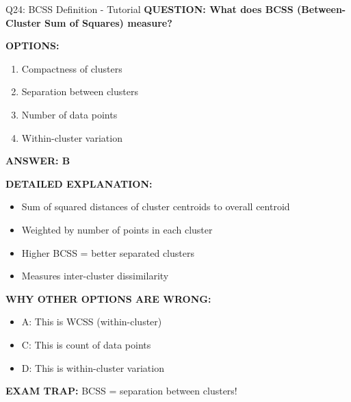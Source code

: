 \documentclass[8pt]{beamer}
\begin{document}
	\begin{frame}{Q24: BCSS Definition - Tutorial}
		\fontsize{6.5}{7.5}\selectfont
		\textbf{QUESTION: What does BCSS (Between-Cluster Sum of Squares) measure?}
		
		\vspace{0.1cm}
		\textbf{OPTIONS:}
		\begin{enumerate}
			\item Compactness of clusters
			\item Separation between clusters
			\item Number of data points
			\item Within-cluster variation
		\end{enumerate}
		
		\vspace{0.1cm}
		\textcolor{myblue}{\textbf{ANSWER: B}}
		
		\vspace{0.1cm}
		\textbf{DETAILED EXPLANATION:}
		\begin{itemize}
			\item Sum of squared distances of cluster centroids to overall centroid
			\item Weighted by number of points in each cluster
			\item Higher BCSS = better separated clusters
			\item Measures inter-cluster dissimilarity
		\end{itemize}
		
		\vspace{0.1cm}
		\textcolor{myred}{\textbf{WHY OTHER OPTIONS ARE WRONG:}}
		\begin{itemize}
			\item \textcolor{myred}{A:} This is WCSS (within-cluster)
			\item \textcolor{myred}{C:} This is count of data points
			\item \textcolor{myred}{D:} This is within-cluster variation
		\end{itemize}
		
		\textcolor{myred}{\textbf{EXAM TRAP:}} BCSS = \textcolor{myblue}{separation between clusters}!
	\end{frame}
	
\end{document}
